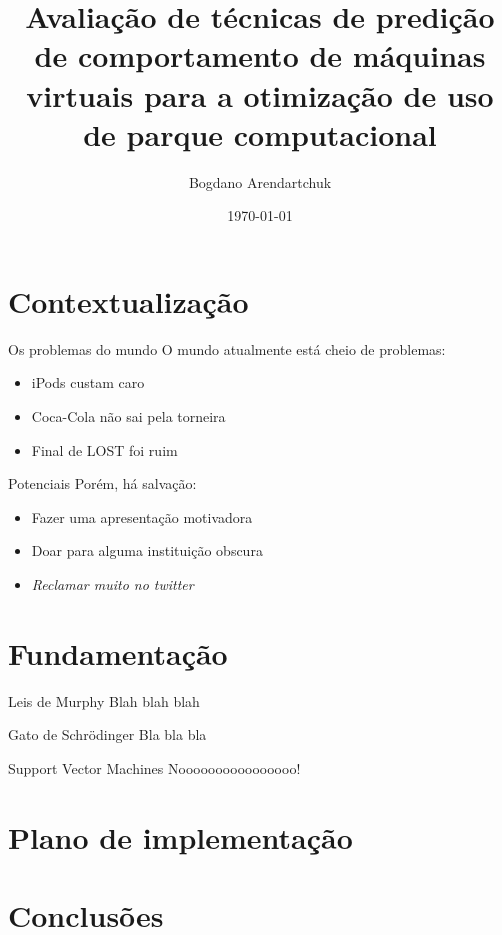 \documentclass{beamer}
\institute{Universidade Tuiuti do Paraná}
\author{Bogdano Arendartchuk}
\title{Avaliação de técnicas de predição de comportamento de máquinas
virtuais para a otimização de uso de parque computacional}
\date{\today}
\begin{document}
\frame{\titlepage}

\section{Contextualização}
\begin{frame}{Os problemas do mundo}
O mundo atualmente está cheio de \textsf{problemas}:
\begin{itemize}
  \item iPods custam caro
  \item Coca-Cola não sai pela torneira
  \item Final de LOST foi ruim
\end{itemize}
\end{frame}
\begin{frame}{Potenciais}
Porém, há salvação:
\begin{itemize}
  \item Fazer uma apresentação motivadora
  \item Doar para alguma instituição obscura
  \item \emph{Reclamar muito no twitter}
\end{itemize}
\end{frame}

\section{Fundamentação}
\begin{frame}{Leis de Murphy}
 Blah blah blah
\end{frame}
\begin{frame}{Gato de Schrödinger}
 Bla bla bla
\end{frame}
\begin{frame}{Support Vector Machines}
 Noooooooooooooooo!
\end{frame}

\section{Plano de implementação}

\section{Conclusões}
\end{document}
